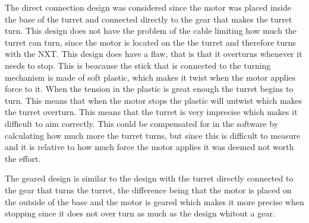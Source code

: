 The direct connection design was considered since the motor was placed inside
the base of the turret and connected directly to the gear that makes the turret turn. This
design does not have the problem of the cable limiting how much the turret can
turn, since the motor is located on the the turret and therefore turns with the
NXT. This design does have a flaw, that is that it overturns whenever it needs
to stop. This is beacause the stick that is connected to the turning mechanism
is made of soft plastic, which makes it twist when the motor applies force to
it. When the tension in the plastic is great enough the turret begins to turn.
This means that when the motor stops the plastic will untwist which makes the
turret overturn. This means that the turret is very imprecise which makes it
difficult to aim correctly. This could be compensated for in the software by
calculating how much more the turret turns, but since this is difficult to
measure and it is relative to how much force the motor applies it was deemed
not worth the effort.\nl

The geared design is similar to the design with the turret directly connected to
the gear that turns the turret, the difference being that the motor is placed on
the outside of the base and the motor is geared which makes it more precise when
stopping since it does not over turn as much as the design whitout a gear. 


